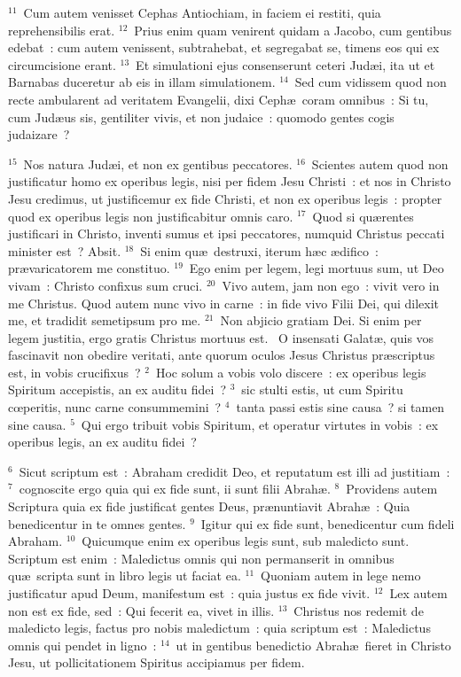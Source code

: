 ${}^{11}$~Cum autem venisset Cephas Antiochiam, in faciem ei restiti, quia reprehensibilis erat.
${}^{12}$~Prius enim quam venirent quidam a Jacobo, cum gentibus edebat~: cum autem venissent, subtrahebat, et segregabat se, timens eos qui ex circumcisione erant.
${}^{13}$~Et simulationi ejus consenserunt ceteri Jud\ae i, ita ut et Barnabas duceretur ab eis in illam simulationem.
${}^{14}$~Sed cum vidissem quod non recte ambularent ad veritatem Evangelii, dixi Ceph\ae\ coram omnibus~: Si tu, cum Jud\ae us sis, gentiliter vivis, et non judaice~: quomodo gentes cogis judaizare~?


${}^{15}$~Nos natura Jud\ae i, et non ex gentibus peccatores.
${}^{16}$~Scientes autem quod non justificatur homo ex operibus legis, nisi per fidem Jesu Christi~: et nos in Christo Jesu credimus, ut justificemur ex fide Christi, et non ex operibus legis~: propter quod ex operibus legis non justificabitur omnis caro.
${}^{17}$~Quod si qu\ae rentes justificari in Christo, inventi sumus et ipsi peccatores, numquid Christus peccati minister est~? Absit.
${}^{18}$~Si enim qu\ae\ destruxi, iterum h\ae c \ae difico~: pr\ae varicatorem me constituo.
${}^{19}$~Ego enim per legem, legi mortuus sum, ut Deo vivam~: Christo confixus sum cruci.
${}^{20}$~Vivo autem, jam non ego~: vivit vero in me Christus. Quod autem nunc vivo in carne~: in fide vivo Filii Dei, qui dilexit me, et tradidit semetipsum pro me.
${}^{21}$~Non abjicio gratiam Dei. Si enim per legem justitia, ergo gratis Christus mortuus est.
~O insensati Galat\ae , quis vos fascinavit non obedire veritati, ante quorum oculos Jesus Christus pr\ae scriptus est, in vobis crucifixus~?
${}^{2}$~Hoc solum a vobis volo discere~: ex operibus legis Spiritum accepistis, an ex auditu fidei~?
${}^{3}$~sic stulti estis, ut cum Spiritu cœperitis, nunc carne consummemini~?
${}^{4}$~tanta passi estis sine causa~? si tamen sine causa.
${}^{5}$~Qui ergo tribuit vobis Spiritum, et operatur virtutes in vobis~: ex operibus legis, an ex auditu fidei~?


${}^{6}$~Sicut scriptum est~: Abraham credidit Deo, et reputatum est illi ad justitiam~:
${}^{7}$~cognoscite ergo quia qui ex fide sunt, ii sunt filii Abrah\ae .
${}^{8}$~Providens autem Scriptura quia ex fide justificat gentes Deus, pr\ae nuntiavit Abrah\ae~: Quia benedicentur in te omnes gentes.
${}^{9}$~Igitur qui ex fide sunt, benedicentur cum fideli Abraham.
${}^{10}$~Quicumque enim ex operibus legis sunt, sub maledicto sunt. Scriptum est enim~: Maledictus omnis qui non permanserit in omnibus qu\ae\ scripta sunt in libro legis ut faciat ea.
${}^{11}$~Quoniam autem in lege nemo justificatur apud Deum, manifestum est~: quia justus ex fide vivit.
${}^{12}$~Lex autem non est ex fide, sed~: Qui fecerit ea, vivet in illis.
${}^{13}$~Christus nos redemit de maledicto legis, factus pro nobis maledictum~: quia scriptum est~: Maledictus omnis qui pendet in ligno~:
${}^{14}$~ut in gentibus benedictio Abrah\ae\ fieret in Christo Jesu, ut pollicitationem Spiritus accipiamus per fidem.


